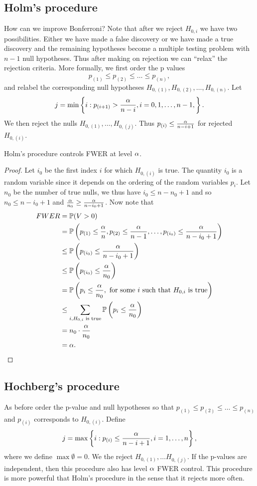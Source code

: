\subsection{Holm's procedure}
How can we improve Bonferroni? Note that after we reject $H_{0,i}$ we have two possibilities. Either we have made a false discovery or we have made a true discovery and the remaining hypotheses become a multiple testing problem with $n-1$ null hypotheses. Thus after making on rejection we can ``relax'' the rejection criteria. More formally, we first order the p values
\[p_{(1)}\le p_{(2)}\le \ldots \le p_{(n)}, \]
and relabel the corresponding null hypotheses $H_{0,(1)}, H_{0,(2)},\ldots, H_{0,(n)}$. Let 
\[j = \min\left\{i : p_{(i+1)} > \frac{{\alpha}}{n-i}, i=0,1,\ldots,n-1, \right\}. \]
We then reject the nulls $H_{0,(1)},\ldots,H_{0,(j)}$. Thus $p_{(i)} \le \frac{{\alpha}}{n-i+1}$ for rejected $H_{0,(i)}$.
\begin{prop}
Holm's procedure controls FWER at level ${\alpha}$.
\end{prop}
\begin{proof}
    Let $i_0$ be the first index $i$ for which $H_{0,(i)}$ is true. The quantity $i_0$ is a random variable since it depends on the ordering of the random variables $p_i$. Let $n_0$ be the number of true nulls, we thus have $i_0 \le n-n_0+1$ and so $n_0 \le n-i_0+1$ and $\frac{{\alpha}}{n_0} \ge \frac{{\alpha}}{n-i_0+1}$. Now note that
    \begin{align*}
        FWER &={\mathbb{P}}(V > 0)\\
        &={\mathbb{P}}\left(p_{(1)} \le \frac{{\alpha}}{n}, p_{(2)} \le \frac{{\alpha}}{n-1},\ldots, p_{(i_0)} \le \frac{{\alpha}}{n-i_0+1}\right)\\
        &\le {\mathbb{P}}\left(p_{(i_0)} \le \frac{{\alpha}}{n-i_0+1}\right)\\
        &\le {\mathbb{P}}\left(p_{(i_0)} \le \frac{{\alpha}}{n_0}\right)\\
        &= {\mathbb{P}}\left(p_{i} \le \frac{{\alpha}}{n_0}, \text{ for some $i$ such that $H_{0,i}$ is true}\right)\\
        &\le \sum_{i, H_{0,i} \text{ is true}} {\mathbb{P}}\left(p_{i}\le \frac{{\alpha}}{n_0}\right)\\
        &=n_0 \cdot \frac{{\alpha}}{n_0}\\
        &={\alpha}. \qedhere
    \end{align*}
\end{proof}
\subsection{Hochberg's procedure}
As before order the p-value and null hypotheses so that $p_{(1)}\le p_{(2)}\le \ldots \le p_{(n)}$ and $p_{(i)}$ corresponds to $H_{0,(i)}$. Define
\[j = \max\left\{i: p_{(i)} \le \frac{{\alpha}}{n-i+1}, i =1,\ldots, n\right\}, \]
where we define $\max \emptyset=0$. We the reject $H_{0,(1)},\ldots H_{0,(j)}$. If the p-values are independent, then this procedure also has level ${\alpha}$ FWER control. This procedure is more powerful that Holm's procedure in the sense that it rejects more often.
